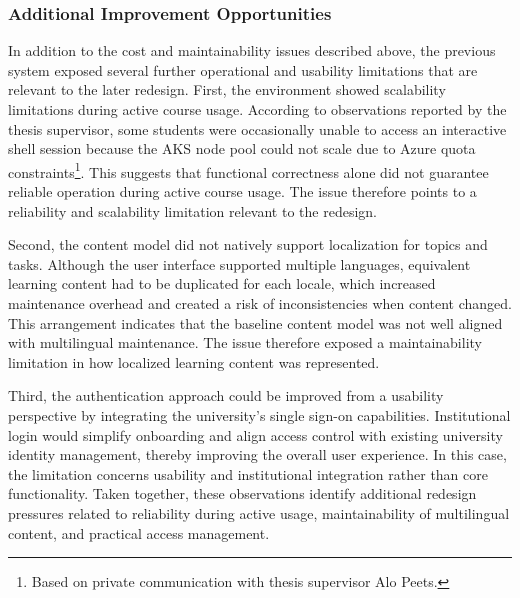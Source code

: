 \subsubsection{Additional Improvement Opportunities} \label{subsubsec:additional-improvement-opportunities}
In addition to the cost and maintainability issues described above, the previous system exposed several further operational and usability limitations that are relevant to the later redesign.
First, the environment showed scalability limitations during active course usage.
According to observations reported by the thesis supervisor, some students were occasionally unable to access an interactive shell session because the AKS node pool could not scale due to Azure quota constraints\footnote{Based on private communication with thesis supervisor Alo Peets.}.
This suggests that functional correctness alone did not guarantee reliable operation during active course usage.
The issue therefore points to a reliability and scalability limitation relevant to the redesign.

Second, the content model did not natively support localization for topics and tasks.
Although the user interface supported multiple languages, equivalent learning content had to be duplicated for each locale, which increased maintenance overhead and created a risk of inconsistencies when content changed.
This arrangement indicates that the baseline content model was not well aligned with multilingual maintenance.
The issue therefore exposed a maintainability limitation in how localized learning content was represented.

Third, the authentication approach could be improved from a usability perspective by integrating the university's single sign-on capabilities.
Institutional login would simplify onboarding and align access control with existing university identity management, thereby improving the overall user experience.
In this case, the limitation concerns usability and institutional integration rather than core functionality.
Taken together, these observations identify additional redesign pressures related to reliability during active usage, maintainability of multilingual content, and practical access management.

